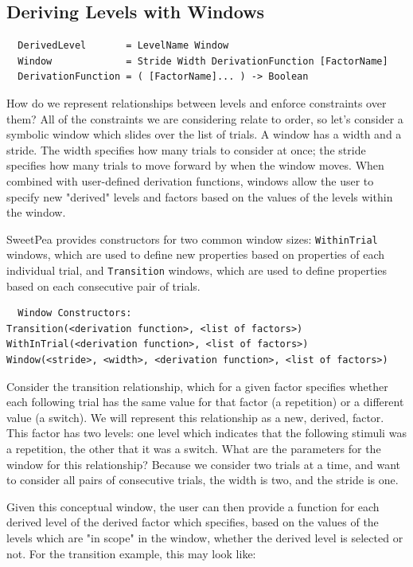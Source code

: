 \subsection{Deriving Levels with Windows}

\begin{verbatim}
  DerivedLevel       = LevelName Window
  Window             = Stride Width DerivationFunction [FactorName]
  DerivationFunction = ( [FactorName]... ) -> Boolean
\end{verbatim}

How do we represent relationships between levels and enforce constraints over them? All of the constraints we are considering relate to order, so let's consider a symbolic window which slides over the list of trials. A window has a width and a stride. The width specifies how many trials to consider at once; the stride specifies how many trials to move forward by when the window moves. When combined with user-defined derivation functions, windows allow the user to specify new "derived" levels and factors based on the values of the levels within the window.

SweetPea provides constructors for two common window sizes: \texttt{WithinTrial} windows, which are used to define new properties based on properties of each individual trial, and \texttt{Transition} windows, which are used to define properties based on each consecutive pair of trials.

\begin{verbatim}
  Window Constructors:
Transition(<derivation function>, <list of factors>)
WithInTrial(<derivation function>, <list of factors>)
Window(<stride>, <width>, <derivation function>, <list of factors>)
\end{verbatim}

Consider the transition relationship, which for a given factor specifies whether each following trial has the same value for that factor (a repetition) or a different value (a switch). We will represent this relationship as a new, derived, factor. This factor has two levels: one level which indicates that the following stimuli was a repetition, the other that it was a switch. What are the parameters for the window for this relationship? Because we consider two trials at a time, and want to consider all pairs of consecutive trials, the width is two, and the stride is one.

Given this conceptual window, the user can then provide a function for each derived level of the derived factor which specifies, based on the values of the levels which are "in scope" in the window, whether the derived level is selected or not. For the transition example, this may look like:

